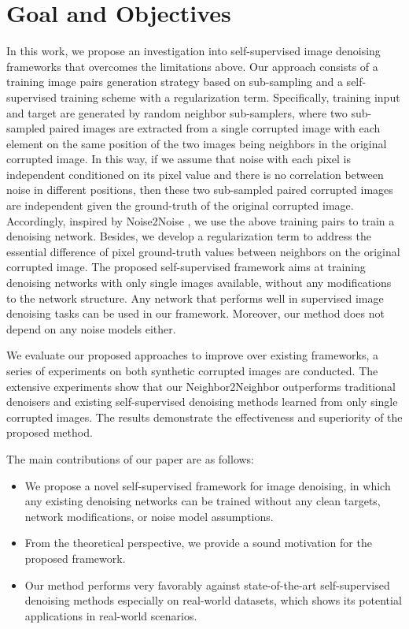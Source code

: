\pagebreak
\section{Goal and Objectives}
\label{sec: Goal and Objectives}
\par In this work, we propose an investigation into self-supervised image denoising frameworks that overcomes \cite{lehtinen2018noise2noise} the limitations above. Our approach consists of a training image pairs generation strategy based on sub-sampling and a self-supervised training scheme with a regularization term. Specifically, training input and target are generated by random neighbor sub-samplers, where two sub-sampled paired images are extracted from a single corrupted image with each element on the same position of the two images being neighbors in the original corrupted image. In this way, if we assume that noise with each pixel is independent conditioned on its pixel value and there is no correlation between noise in different positions, then these two sub-sampled paired corrupted images are independent given the ground-truth of the original corrupted image. Accordingly, inspired by Noise2Noise \cite{lehtinen2018noise2noise}, we use the above training pairs to train a denoising network. Besides, we develop a regularization term to address the essential difference of pixel ground-truth values between neighbors on the original corrupted image. The proposed self-supervised framework aims at training denoising networks with only single images available, without any modifications to the network structure. Any network that performs well in supervised image denoising tasks can be used in our framework. Moreover, our method does not depend on any noise models either.
\par We evaluate our proposed approaches to improve over existing frameworks, a series of experiments on both synthetic corrupted images are conducted. The extensive experiments show that our Neighbor2Neighbor outperforms traditional denoisers and existing self-supervised denoising methods learned from only single corrupted images. The results demonstrate the effectiveness and superiority of the proposed method.
\par The main contributions of our paper are as follows:

\begin{itemize}
    \item We propose a novel self-supervised framework for image denoising, in which any existing denoising networks can be trained without any clean targets, network modifications, or noise model assumptions.
    \item From the theoretical perspective, we provide a sound motivation for the proposed framework.
    \item Our method performs very favorably against state-of-the-art self-supervised denoising methods especially on real-world datasets, which shows its potential applications in real-world scenarios.
\end{itemize}